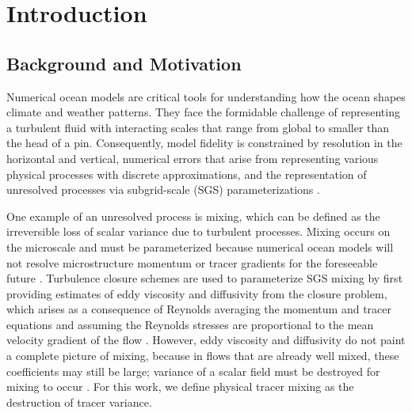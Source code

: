 

\chapter{Introduction}

\section{Background and Motivation}
Numerical ocean models are critical tools for understanding how the ocean shapes climate and weather patterns. They face the formidable challenge of representing a turbulent fluid with interacting scales that range from global to smaller than the head of a pin. Consequently, model fidelity is constrained by resolution in the horizontal and vertical, numerical errors that arise from representing various physical processes with discrete approximations, and the representation of unresolved processes via subgrid-scale (SGS) parameterizations \citep{fox2019challenges}. 

One example of an unresolved process is mixing, which can be defined as the irreversible loss of scalar variance due to turbulent processes. Mixing occurs on the microscale and must be parameterized because numerical ocean models will not resolve microstructure momentum or tracer gradients for the foreseeable future \citep{fox2014principles, Qu_2022_box}. Turbulence closure schemes are used to parameterize SGS mixing by first providing estimates of eddy viscosity and diffusivity from the closure problem, which arises as a consequence of Reynolds averaging the momentum and tracer equations and assuming the Reynolds stresses are proportional to the mean velocity gradient of the flow \citep{pope2001turbulent}. However, eddy viscosity and diffusivity do not paint a complete picture of mixing, because in flows that are already well mixed, these coefficients may still be large; variance of a scalar field must be destroyed for mixing to occur \citep{MacCready_2018, osborn1972oceanic}. For this work, we define physical tracer mixing as the destruction of tracer variance. 

